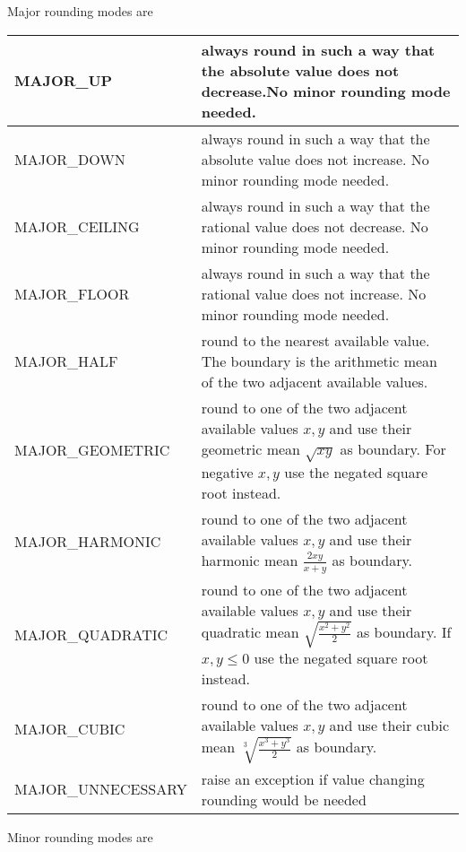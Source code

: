 \documentclass[10pt,a4paper]{article}
\begin{document}
Major rounding modes are 

\begin{tabular}{|l|p{100mm}|}
\hline
  MAJOR\_UP           & always round in such a way that the absolute value does not decrease.No minor rounding mode needed.\\
\hline
  MAJOR\_DOWN         & always round in such a way that the absolute value does not increase. No minor rounding mode needed.\\
\hline
  MAJOR\_CEILING      & always round in such a way that the rational value does not decrease. No minor rounding mode needed.\\
\hline
  MAJOR\_FLOOR        & always round in such a way that the rational value does not increase. No minor rounding mode needed.\\
\hline
  MAJOR\_HALF         & round to the nearest available value.  The boundary is the arithmetic mean of the two adjacent available values.\\
\hline
  MAJOR\_GEOMETRIC    & round to one of the two adjacent available values $x,y$ and use their geometric mean $\sqrt{xy}$ as boundary.  For negative $x,y$ use the negated square root instead.\\
\hline
  MAJOR\_HARMONIC     & round to one of the two adjacent available values $x,y$ and use their harmonic mean $\frac{2xy}{x+y}$ as boundary.\\
\hline
  MAJOR\_QUADRATIC    & round to one of the two adjacent available values $x,y$ and use their quadratic mean $\sqrt{\frac{x^2+y^2}{2}}$ as boundary.  If $x,y\le 0$ use the negated square root instead.\\
\hline
  MAJOR\_CUBIC        & round to one of the two adjacent available values $x,y$ and use their cubic mean $\sqrt[3]{\frac{x^3+y^3}{2}}$ as boundary.\\
\hline
  MAJOR\_UNNECESSARY  & raise an exception if value changing rounding would be needed\\
\hline
\end{tabular}

\pagebreak

Minor rounding modes are
\end{document}
